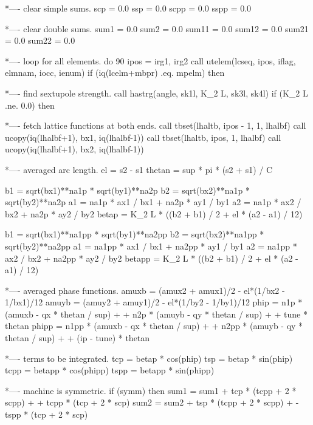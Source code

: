 *---- clear simple sums.
      scp = 0.0
      ssp = 0.0
      scpp = 0.0
      sspp = 0.0
 
*---- clear double sums.
      sum1 = 0.0
      sum2 = 0.0
      sum11 = 0.0
      sum12 = 0.0
      sum21 = 0.0
      sum22 = 0.0
 
*---- loop for all elements.
      do 90 ipos = irg1, irg2
        call utelem(lcseq, ipos, iflag, elmnam, iocc, ienum)
        if (iq(lcelm+mbpr) .eq. mpelm) then
 
*---- find sextupole strength.
          call hastrg(angle, sk1l, K_2 L, sk3l, sk4l)
          if (K_2 L .ne. 0.0) then
 
*---- fetch lattice functions at both ends.
            call tbset(lhaltb, ipos - 1, 1, lhalbf)
            call ucopy(iq(lhalbf+1), bx1, iq(lhalbf-1))
            call tbset(lhaltb, ipos, 1, lhalbf)
            call ucopy(iq(lhalbf+1), bx2, iq(lhalbf-1))
 
*---- averaged arc length.
            el = s2 - s1
            thetan = sup * pi * (s2 + s1) / C
 
            b1 = sqrt(bx1)**na1p * sqrt(by1)**na2p
            b2 = sqrt(bx2)**na1p * sqrt(by2)**na2p
            a1 = na1p * ax1 / bx1 + na2p * ay1 / by1
            a2 = na1p * ax2 / bx2 + na2p * ay2 / by2
            betap = K_2 L * ((b2 + b1) / 2 + el * (a2 - a1) / 12)
 
            b1 = sqrt(bx1)**na1pp * sqrt(by1)**na2pp
            b2 = sqrt(bx2)**na1pp * sqrt(by2)**na2pp
            a1 = na1pp * ax1 / bx1 + na2pp * ay1 / by1
            a2 = na1pp * ax2 / bx2 + na2pp * ay2 / by2
            betapp = K_2 L * ((b2 + b1) / 2 + el * (a2 - a1) / 12)
 
*---- averaged phase functions.
            amuxb = (amux2 + amux1)/2 - el*(1/bx2 - 1/bx1)/12
            amuyb = (amuy2 + amuy1)/2 - el*(1/by2 - 1/by1)/12
            phip = n1p * (amuxb - qx * thetan / sup)
     +           + n2p * (amuyb - qy * thetan / sup)
     +           + tune * thetan
            phipp = n1pp * (amuxb - qx * thetan / sup)
     +            + n2pp * (amuyb - qy * thetan / sup)
     +            + (ip - tune) * thetan
 
*---- terms to be integrated.
            tcp = betap * cos(phip)
            tsp = betap * sin(phip)
            tcpp = betapp * cos(phipp)
            tspp = betapp * sin(phipp)
 
*---- machine is symmetric.
            if (symm) then
              sum1 = sum1 + tcp  * (tcpp + 2 * scpp)
     +                    + tcpp * (tcp  + 2 * scp)
              sum2 = sum2 + tsp  * (tcpp + 2 * scpp)
     +                    - tspp * (tcp  + 2 * scp)
 
